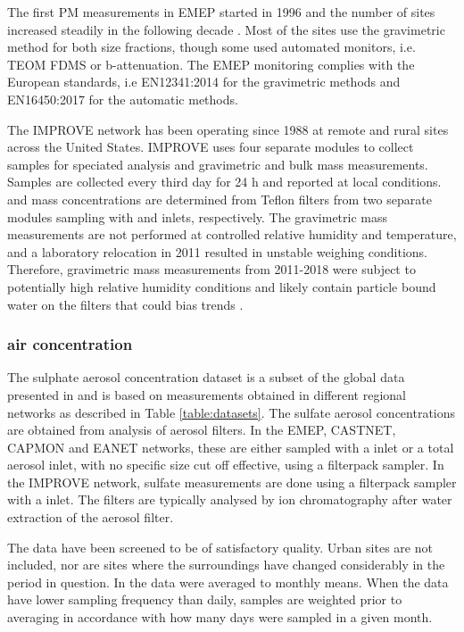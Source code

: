 \documentclass[acp, manuscript]{copernicus}
\begin{document}
The first PM measurements in EMEP started in 1996 and the number of sites increased steadily in the following decade \citep{torseth2012}. Most of the sites use the gravimetric method for both size fractions, though some used automated monitors, i.e. TEOM FDMS or b-attenuation. The EMEP monitoring complies with the European standards, i.e EN12341:2014 for the gravimetric methods and  EN16450:2017 for the automatic methods. 

The IMPROVE network has been operating since 1988 at remote and rural sites across the United States. IMPROVE uses four separate modules to collect samples for speciated  analysis and gravimetric  and  bulk mass measurements. Samples are collected every third day for 24 h and reported at local conditions.  and  mass concentrations are determined from Teflon filters from two separate modules sampling with  and  inlets, respectively. The gravimetric mass measurements are not performed at controlled relative humidity and temperature, and a laboratory relocation in 2011 resulted in unstable weighing conditions. Therefore, gravimetric mass measurements from 2011-2018 were subject to potentially high relative humidity conditions and likely contain particle bound water on the filters that could bias trends \citep{Hand2019}.



\subsubsection{ air concentration}
 The sulphate aerosol concentration dataset is a subset of the global data presented in \cite{aas2019global} and is based on measurements obtained in different regional networks as described in Table \ref{table:datasets}. The sulfate aerosol concentrations are obtained from analysis of aerosol filters. In the EMEP, CASTNET, CAPMON and EANET networks, these are either sampled with a  inlet or a total aerosol inlet, with no specific size cut off effective, using a filterpack sampler.  In the IMPROVE network, sulfate measurements are done using a filterpack sampler with a  inlet. The filters are typically analysed by ion chromatography after water extraction of the aerosol filter.

The data have been screened to be of satisfactory quality. Urban sites are not included, nor are sites where the surroundings have changed considerably in the period in question.
In \cite{aas2019global} the data  were averaged to monthly means.  When the data have lower sampling frequency than daily, samples are weighted prior to averaging in accordance with how many days were sampled in a given month.
\end{document}
